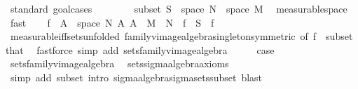 \begin{isabellebody}
%
\isadelimproof
%
\endisadelimproof
%
\isatagproof
{}\isamarkupfalse%
\ {\isacharparenleft}{\kern0pt}standard{\isacharcomma}{\kern0pt}\ goal{\isacharunderscore}{\kern0pt}cases{\isacharparenright}{\kern0pt}\isanewline
\ \ \isamarkupfalse%
\ {}\isanewline
\ \ \isamarkupfalse%
\ subset{\isacharcolon}{\kern0pt}\ {\isachardoublequoteopen}S\ {\isasymsubseteq}\ space\ N\ {\isasymrightarrow}\ space\ M{\isachardoublequoteclose}\ \isamarkupfalse%
\ measurable{\isacharunderscore}{\kern0pt}space\ \isamarkupfalse%
\ fast\isanewline
\ \ \isamarkupfalse%
\ {\isachardoublequoteopen}{\isacharbraceleft}{\kern0pt}f\ {\isacharminus}{\kern0pt}{\isacharbackquote}{\kern0pt}\ A\ {\isasyminter}\ space\ N\ {\isacharbar}{\kern0pt}A{\isachardot}{\kern0pt}\ A\ {\isasymin}\ M{\isacharbraceright}{\kern0pt}\ {\isasymsubseteq}\ N{\isachardoublequoteclose}\ \ {\isachardoublequoteopen}f\ {\isasymin}\ S{\isachardoublequoteclose}\ \ f\ \isamarkupfalse%
\ measurable{\isacharunderscore}{\kern0pt}iff{\isacharunderscore}{\kern0pt}sets{\isacharbrackleft}{\kern0pt}unfolded\ family{\isacharunderscore}{\kern0pt}vimage{\isacharunderscore}{\kern0pt}algebra{\isacharunderscore}{\kern0pt}singleton{\isacharbrackleft}{\kern0pt}symmetric{\isacharbrackright}{\kern0pt}{\isacharcomma}{\kern0pt}\ of\ f{\isacharbrackright}{\kern0pt}\ {}\ subset\ that\ \isamarkupfalse%
\ {\isacharparenleft}{\kern0pt}fastforce\ simp\ add{\isacharcolon}{\kern0pt}\ sets{\isacharunderscore}{\kern0pt}family{\isacharunderscore}{\kern0pt}vimage{\isacharunderscore}{\kern0pt}algebra{\isacharparenright}{\kern0pt}\isanewline
\ \ \isamarkupfalse%
\ \isamarkupfalse%
\ {\isacharquery}{\kern0pt}case\ \isamarkupfalse%
\ sets{\isacharunderscore}{\kern0pt}family{\isacharunderscore}{\kern0pt}vimage{\isacharunderscore}{\kern0pt}algebra\ \isamarkupfalse%
\ sets{\isachardot}{\kern0pt}sigma{\isacharunderscore}{\kern0pt}algebra{\isacharunderscore}{\kern0pt}axioms\ \isamarkupfalse%
\ {\isacharparenleft}{\kern0pt}simp\ add{\isacharcolon}{\kern0pt}\ subset{\isacharcomma}{\kern0pt}\ intro\ sigma{\isacharunderscore}{\kern0pt}algebra{\isachardot}{\kern0pt}sigma{\isacharunderscore}{\kern0pt}sets{\isacharunderscore}{\kern0pt}subset{\isacharcomma}{\kern0pt}\ blast{\isacharplus}{\kern0pt}{\isacharparenright}{\kern0pt}\isanewline
{}\isamarkupfalse%
\isanewline
\ \ \isamarkupfalse%

\end{isabellebody}
